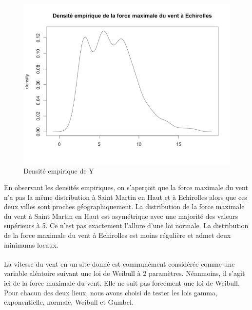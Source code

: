 \noindent%
\begin{figure}[H]
    \begin{center}
      \includegraphics[width=12 cm, angle=0]{./pictures/densityy.png}
      \centering\caption{\label{2} Densité empirique de Y}
    \end{center}
\end{figure}

En observant les densités empiriques, on s'aperçoit que la force maximale du vent n'a pas la même distribution à Saint Martin en Haut et à Echirolles alors que ces deux villes sont proches géographiquement.
La distribution de la force maximale du vent à Saint Martin en Haut est asymétrique avec une majorité des valeurs supérieurs à 5. Ce n'est pas exactement l'allure d'une loi normale. La distribution de la force maximale du vent à Echirolles est moins régulière et admet deux minimums locaux.
\\ \\
La vitesse du vent en un site donné est communément considérée comme une variable aléatoire suivant une loi de Weibull à 2 paramètres. Néanmoins, il s'agit ici de la force maximale du vent. Elle ne suit pas forcément une loi de Weibull. 
Pour chacun des deux lieux, nous avons choisi de tester les lois gamma, exponentielle, normale, Weibull et Gumbel.

